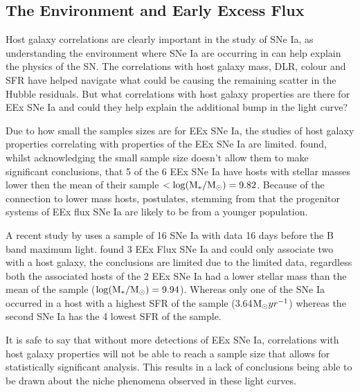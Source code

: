 \subsection{The Environment and Early Excess Flux} \label{subsec: The Environment and Early Excess Flux}
Host galaxy correlations are clearly important in the study of SNe Ia, as understanding the environment where SNe Ia are occurring in can help explain the physics of the SN. The correlations with host galaxy mass, DLR, colour and SFR have helped navigate what could be causing the remaining scatter in the Hubble residuals. But what correlations with host galaxy properties are there for EEx SNe Ia and could they help explain the additional bump in the light curve?   

Due to how small the samples sizes are for EEx SNe Ia, the studies of host galaxy properties correlating with properties of the EEx SNe Ia are limited. \textcite{deckers_constraining_2022} found, whilst acknowledging the small sample size doesn't allow them to make significant conclusions, that 5 of the 6 EEx SNe Ia have hosts with stellar masses lower then the mean of their sample \(<\log(\textup{M}_*/\textup{M}_{\odot})=9.82\). Because of the connection to lower mass hosts, \textcite{deckers_constraining_2022} postulates, stemming from \textcite{rigault_strong_2020} that the progenitor systems of EEx flux SNe Ia are likely to be from a younger population. 

A recent study by \textcite{wu_wfst_2026} uses a sample of 16 SNe Ia with data 16 days before the B band maximum light. \textcite{wu_wfst_2026} found 3 EEx Flux SNe Ia and could only associate two with a host galaxy, the conclusions are limited due to the limited data, regardless both the associated hosts of the 2 EEx SNe Ia had a lower stellar mass than the mean of the sample (\(\log(\textup{M}_*/\textup{M}_{\odot})=9.94\)). Whereas only one of the SNe Ia occurred in a host with a highest SFR of the sample (3.64\(\textup{M}_{\odot}yr^{-1}\)) whereas the second SNe Ia has the 4 lowest SFR of the sample. 

It is safe to say that without more detections of EEx SNe Ia, correlations with host galaxy properties will not be able to reach a sample size that allows for statistically significant analysis. This results in a lack of conclusions being able to be drawn about the niche phenomena observed in these light curves.